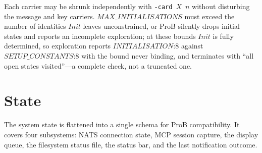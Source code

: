 \documentclass[a4paper,10pt,fleqn]{article}
\begin{document}
Each carrier may be shrunk independently with \texttt{-card}~$X$~$n$
without disturbing the message and key carriers.  $MAX\_INITIALISATIONS$
must exceed the number of identities $Init$ leaves unconstrained, or ProB
silently drops initial states and reports an incomplete exploration; at
these bounds $Init$ is fully determined, so exploration reports
$INITIALISATION$:$8$ against $SETUP\_CONSTANTS$:$8$ with the bound never
binding, and terminates with ``all open states visited''---a complete
check, not a truncated one.

\section{State}
\label{sec:state}

The system state is flattened into a single schema for ProB
compatibility.  It covers four subsystems: NATS connection state,
MCP session capture, the display queue, the filesystem status file,
the status bar, and the last notification outcome.
\end{document}
